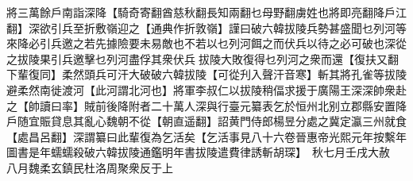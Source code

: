 將三萬餘戶南詣深降【騎奇寄翻酋慈秋翻長知兩翻乜母野翻虜姓也將即亮翻降戶江翻】深欲引兵至折敷嶺迎之【通典作折敦嶺】謹曰破六韓拔陵兵勢甚盛聞乜列河等來降必引兵邀之若先據險要未易敵也不若以乜列河餌之而伏兵以待之必可破也深從之拔陵果引兵邀擊乜列河盡俘其衆伏兵拔陵大敗復得乜列河之衆而還【復扶又翻下輩復同】柔然頭兵可汗大破破六韓拔陵【可從刋入聲汗音寒】斬其將孔雀等拔陵避柔然南徙渡河【此河謂北河也】將軍李叔仁以拔陵稍偪求援于廣陽王深深帥衆赴之【帥讀曰率】賊前後降附者二十萬人深與行臺元纂表乞於恒州北别立郡縣安置降戶随宜賑貸息其亂心魏朝不從【朝直遥翻】詔黄門侍郎楊昱分處之冀定瀛三州就食【處昌呂翻】深謂纂曰此輩復為乞活矣【乞活事見八十六卷晉惠帝光熙元年按繫年圖書是年蠕蠕殺破六韓拔陵通鑑明年書拔陵遣費律誘斬胡琛】　秋七月壬戌大赦　八月魏柔玄鎮民杜洛周聚衆反于上